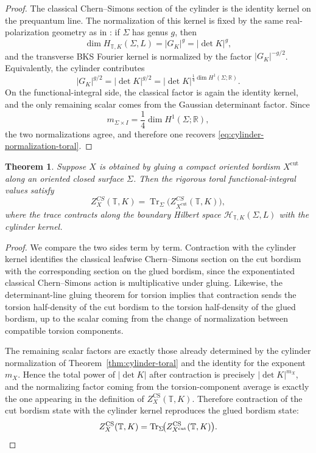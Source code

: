 \documentclass[12pt]{amsart}
\numberwithin{equation}{section}
\newtheorem{theorem}{Theorem}[section]
\begin{document}
\begin{proof}
The classical Chern--Simons section of the cylinder is the identity kernel on the prequantum line. The normalization of this kernel is fixed by the same real-polarization geometry as in \cite{Galviz2}: if \(\Sigma\) has genus \(g\), then
\[
\dim H_{\mathbb T,K}(\Sigma,L)=|G_K|^g=|\det K|^g,
\]
and the transverse BKS Fourier kernel is normalized by the factor \(|G_K|^{-g/2}\). Equivalently, the cylinder contributes
\[
|G_K|^{g/2}=|\det K|^{g/2}=|\det K|^{\frac14 \dim H^1(\Sigma;\mathbb R)}.
\]
On the functional-integral side, the classical factor is again the identity kernel, and the only remaining scalar comes from the Gaussian determinant factor. Since
\[
m_{\Sigma\times I}=\frac14 \dim H^1(\Sigma;\mathbb R),
\]
the two normalizations agree, and therefore one recovers \eqref{eq:cylinder-normalization-toral}.
\end{proof}

\begin{theorem}
\label{thm:gluing-toral}
Suppose \(X\) is obtained by gluing a compact oriented bordism \(X^{\mathrm{cut}}\) along an
oriented closed surface \(\Sigma\). Then the rigorous toral functional-integral values satisfy
\begin{equation}
\label{eq:gluing-formula-toral}
Z^{CS}_X(\mathbb T,K)
=
\operatorname{Tr}_\Sigma\bigl(
Z^{CS}_{X^{\mathrm{cut}}}(\mathbb T,K)
\bigr),
\end{equation}
where the trace contracts along the boundary Hilbert space
\(\mathcal H_{\mathbb T,K}(\Sigma,L)\) with the cylinder kernel.
\end{theorem}

\begin{proof}
We compare the two sides term by term. Contraction with the cylinder kernel identifies
the classical leafwise Chern--Simons section on the cut bordism with the corresponding
section on the glued bordism, since the exponentiated classical Chern--Simons action is
multiplicative under gluing. Likewise, the determinant-line gluing theorem for torsion
implies that contraction sends the torsion half-density of the cut bordism to the torsion
half-density of the glued bordism, up to the scalar coming from the change of normalization
between compatible torsion components.

The remaining scalar factors are exactly those already determined by the cylinder
normalization of Theorem~\ref{thm:cylinder-toral} and the  identity for the exponent \(m_X\).
Hence the total power of \(|\det K|\) after contraction is precisely \(|\det K|^{m_X}\), and the
normalizing factor coming from the torsion-component average is exactly the one appearing
in the definition of \(Z_X^{\mathrm{CS}}(\mathbb T,K)\). Therefore contraction of the cut bordism state with
the cylinder kernel reproduces the glued bordism state:
\[
Z_X^{\mathrm{CS}}(\mathbb T,K)=\operatorname{Tr}_\Sigma\!\bigl(Z_{X^{\mathrm{cut}}}^{\mathrm{CS}}(\mathbb T,K)\bigr).
\qedhere
\]
\end{proof}
\end{document}
